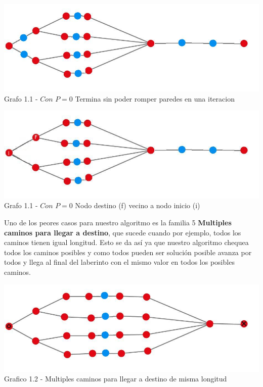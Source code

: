\vspace*{0.3cm} \vspace*{0.3cm}
  \begin{center}
\includegraphics[scale=0.7]{./EJ1/ej1grafomejorcaso.jpeg}
{Grafo 1.1 - $Con$ $P=0$ Termina sin poder romper paredes en una iteracion}
  \end{center}
  \vspace*{0.3cm}

\vspace*{0.3cm} \vspace*{0.3cm}
  \begin{center}
\includegraphics[scale=0.7]{./EJ1/ej1grafomejorcaso2.jpeg}
{Grafo 1.1 - $Con$ $P=0$ Nodo destino (f) vecino a nodo inicio (i)}
  \end{center}
  \vspace*{0.3cm}

Uno de los peores casos para nuestro algoritmo es la familia 5 \textbf{Multiples caminos para llegar a destino}, que sucede cuando por ejemplo, todos los caminos tienen igual longitud. Esto se da as\'i ya que nuestro algoritmo chequea todos los caminos posibles y como todos pueden ser soluci\'on posible avanza por todos y llega al final del laberinto con el mismo valor en todos los posibles caminos.\\

\vspace*{0.3cm} \vspace*{0.3cm}
  \begin{center}
\includegraphics[scale=0.7]{./EJ1/ej1grafopeorcaso.jpeg}
{Grafico 1.2 - Multiples caminos para llegar a destino de misma longitud}
  \end{center}
  \vspace*{0.3cm}

